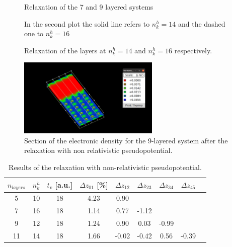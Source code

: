 \documentclass[a4paper, 11pt]{article}
\begin{document}
    \begin{figure}
      \centering
      \caption{Relaxation of the 7 and 9 layered systems}
      \label{fig:nl7-9r}
    \end{figure}

    \begin{figure}
      \centering
      \caption{In the second plot the solid line refers to $n_k^h = 14$ and the dashed one to $n_k^h = 16$}
      \label{fig:nl11}
    \end{figure}

    \begin{figure}
      \centering
      \caption{Relaxation of the layers at $n_k^h = 14$ and $n_k^h = 16$ respectively.}
      \label{fig:nl11r}
    \end{figure}

    \begin{figure}
      \centering
      \includegraphics[width=0.6\textwidth]{img/al-nl9-multi.png}
      \caption{Section of the electronic density for the 9-layered system after the relaxation with non relativistic pseudopotential.}
      \label{fig:nl9-rho}
    \end{figure}

    \begin{table}[H]
      \centering
      \begin{tabular}{ccccccccc}
        \toprule
        $n_{layers}$ & $n_k^h$ & $t_v$ [a.u.] & $\Delta z_{01}$ [\%] & $\Delta z_{12}$ & $\Delta z_{23}$ & $\Delta z_{34}$ & $\Delta z_{45}$ \\
        \midrule
        5  & 10 & 18 & 4.23 & 0.90 & & & \\
        7  & 16 & 18 & 1.14 & 0.77 & -1.12 & & \\
        9  & 12 & 18 & 1.24 & 0.90 & 0.03 & -0.99 & \\
        11 & 14 & 18 & 1.66 & -0.02 & -0.42 & 0.56 & -0.39 \\
        \bottomrule
      \end{tabular}
      \caption{Results of the relaxation with non-relativistic pseudopotential.}
      \label{tab:surface_results}
    \end{table}
\end{document}
